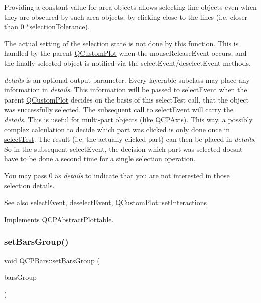 Providing a constant value for area objects allows selecting line objects even when they are obscured by such area objects, by clicking close to the lines (i.\+e. closer than 0.$\ast$selection\+Tolerance).

The actual setting of the selection state is not done by this function. This is handled by the parent \mbox{\hyperlink{class_q_custom_plot}{Q\+Custom\+Plot}} when the mouse\+Release\+Event occurs, and the finally selected object is notified via the select\+Event/deselect\+Event methods.

{\itshape details} is an optional output parameter. Every layerable subclass may place any information in {\itshape details}. This information will be passed to select\+Event when the parent \mbox{\hyperlink{class_q_custom_plot}{Q\+Custom\+Plot}} decides on the basis of this select\+Test call, that the object was successfully selected. The subsequent call to select\+Event will carry the {\itshape details}. This is useful for multi-\/part objects (like \mbox{\hyperlink{class_q_c_p_axis}{Q\+C\+P\+Axis}}). This way, a possibly complex calculation to decide which part was clicked is only done once in \mbox{\hyperlink{class_q_c_p_bars_a62d66cc8eedca6bedfc1f6513164d418}{select\+Test}}. The result (i.\+e. the actually clicked part) can then be placed in {\itshape details}. So in the subsequent select\+Event, the decision which part was selected doesn\textquotesingle{}t have to be done a second time for a single selection operation.

You may pass 0 as {\itshape details} to indicate that you are not interested in those selection details.

\begin{DoxySeeAlso}{See also}
select\+Event, deselect\+Event, \mbox{\hyperlink{class_q_custom_plot_a5ee1e2f6ae27419deca53e75907c27e5}{Q\+Custom\+Plot\+::set\+Interactions}} 
\end{DoxySeeAlso}


Implements \mbox{\hyperlink{class_q_c_p_abstract_plottable_a38efe9641d972992a3d44204bc80ec1d}{Q\+C\+P\+Abstract\+Plottable}}.

\mbox{\label{class_q_c_p_bars_aedd1709061f0b307c47ddb45e172ef9a}} 
\subsubsection{\texorpdfstring{set\+Bars\+Group()}{setBarsGroup()}}
{\footnotesize\ttfamily void Q\+C\+P\+Bars\+::set\+Bars\+Group (\begin{DoxyParamCaption}\item[{\mbox{\hyperlink{class_q_c_p_bars_group}{Q\+C\+P\+Bars\+Group}} $\ast$}]{bars\+Group }\end{DoxyParamCaption})}

